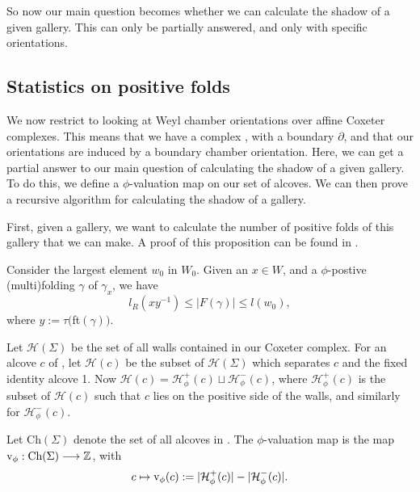 \documentclass[11pt]{article}
\begin{document}
So now our main question becomes whether we can calculate the shadow of a given gallery. This can only be partially answered, and only with specific orientations. 

\subsection{Statistics on positive folds}

We now restrict to looking at Weyl chamber orientations over affine Coxeter complexes. This means that we have a complex \sg, with a boundary $\partial$\sg, and that our orientations are induced by a boundary chamber orientation. Here, we can get a partial answer to our main question of calculating the shadow of a given gallery. To do this, we define a $\phi$-valuation map on our set of alcoves. We can then prove a recursive algorithm for calculating the shadow of a gallery.

First, given a gallery, we want to calculate the number of positive folds of this gallery that we can make. A proof of this proposition can be found in \cite{DEL}.

\begin{proposition}
    Consider the largest element $w_0$ in $W_0$. Given an $x\in W$, and a $\phi$-postive (multi)folding $\gamma$ of $\gamma_x$, we have
    \[l_R(xy^{-1})\leq |F(\gamma)|\leq l(w_0),\]
    where $y:=\tau($ft$(\gamma))$.
\end{proposition}


\begin{definition}
    Let $\mathcal{H}(\Sigma)$ be the set of all walls contained in our Coxeter complex. For an alcove $c$ of \sg, let $\mathcal{H}(c)$ be the subset of $\mathcal{H}(\Sigma)$ which separates $c$ and the fixed identity alcove 1. Now $\mathcal{H}(c)=\mathcal{H}_{\phi}^+(c)\sqcup \mathcal{H}_{\phi}^-(c)$, where $\mathcal{H}_{\phi}^+(c)$ is the subset of $\mathcal{H}(c)$ such that $c$ lies on the positive side of the walls, and similarly for $\mathcal{H}_{\phi}^-(c)$.
\end{definition}


\begin{definition}
    Let Ch$(\Sigma)$ denote the set of all alcoves in \sg. The $\phi$-valuation map is the map $\textnormal{v}_\phi:\textnormal{Ch}(\Sigma)\longrightarrow\mathbb{Z}$, with
    \[c\mapsto \textnormal{v}_\phi(c):= |\mathcal{H}_{\phi}^+(c)|-|\mathcal{H}_{\phi}^-(c)|.\]
\end{definition}
\end{document}
